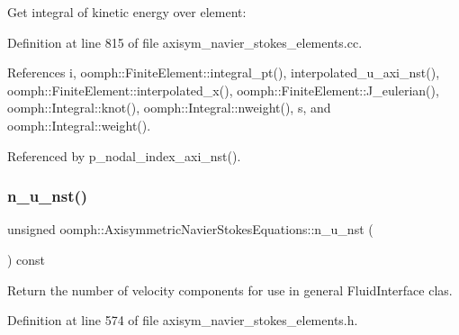 Get integral of kinetic energy over element\+: 

Definition at line 815 of file axisym\+\_\+navier\+\_\+stokes\+\_\+elements.\+cc.



References i, oomph\+::\+Finite\+Element\+::integral\+\_\+pt(), interpolated\+\_\+u\+\_\+axi\+\_\+nst(), oomph\+::\+Finite\+Element\+::interpolated\+\_\+x(), oomph\+::\+Finite\+Element\+::\+J\+\_\+eulerian(), oomph\+::\+Integral\+::knot(), oomph\+::\+Integral\+::nweight(), s, and oomph\+::\+Integral\+::weight().



Referenced by p\+\_\+nodal\+\_\+index\+\_\+axi\+\_\+nst().

\mbox{\label{classoomph_1_1AxisymmetricNavierStokesEquations_aa1749260b72bab92bc64234d9c8c57d8}} 
\subsubsection{\texorpdfstring{n\+\_\+u\+\_\+nst()}{n\_u\_nst()}}
{\footnotesize\ttfamily unsigned oomph\+::\+Axisymmetric\+Navier\+Stokes\+Equations\+::n\+\_\+u\+\_\+nst (\begin{DoxyParamCaption}{ }\end{DoxyParamCaption}) const\hspace{0.3cm}{\ttfamily [inline]}}



Return the number of velocity components for use in general Fluid\+Interface clas. 



Definition at line 574 of file axisym\+\_\+navier\+\_\+stokes\+\_\+elements.\+h.

\mbox{\label{classoomph_1_1AxisymmetricNavierStokesEquations_a89edaffb4913131cc14a5f6e45ed117a}} 
